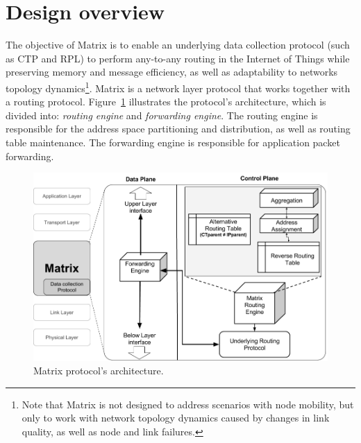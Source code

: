 \section{Design overview}
\label{sec:matrix}

The objective of Matrix is to enable an underlying data collection protocol (such as CTP and RPL) to perform any-to-any routing in the Internet of Things while preserving memory and message efficiency, as well as adaptability to networks topology dynamics\footnote{Note that Matrix is not designed to address scenarios with node mobility, but only to work with network topology dynamics caused by changes in link quality, as well as node and link failures.}. Matrix is a network layer protocol that works together with a routing protocol. Figure~\ref{fig:architecture} illustrates the protocol's architecture, which is divided into: \textit{routing engine} and \textit{forwarding engine}. The routing engine is responsible for the address space partitioning and distribution, as well as routing table maintenance. The forwarding engine is responsible for application packet forwarding.

\begin{figure}[t]
    \centering
    \includegraphics[width=1\columnwidth]{./Images/matrix-architecture}
\caption{Matrix protocol's architecture.}
    \label{fig:architecture}
\end{figure}

